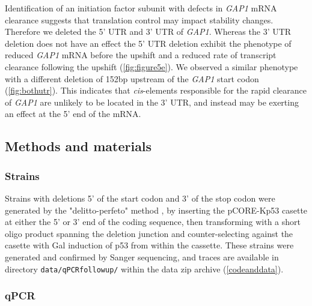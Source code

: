 Identification of an initiation factor subunit with defects in
\textit{GAP1} mRNA clearance suggests that translation control may
impact stability changes. Therefore we deleted the 5' UTR
and 3' UTR of \textit{GAP1}. 
Whereas the 3’ UTR deletion does not have an effect the 5’ UTR deletion
exhibit the phenotype of reduced \textit{GAP1} mRNA before the upshift
and a reduced rate of transcript clearance following the upshift
(\autoref{fig:figure5e}). 
We observed a similar phenotype with a different deletion of 152bp upstream
of the \textit{GAP1} start codon (\autoref{fig:bothutr}). 
This indicates that \textit{cis}-elements responsible for the
rapid clearance of \textit{GAP1} are unlikely to be located in the
3' UTR, and instead may be exerting an effect at the 5' end of the
mRNA.

\subsection{Methods and materials}

\subsubsection{Strains}

Strains with deletions 5' of the start codon and 3' of the stop
codon were generated by the "delitto-perfeto" 
method \parencite{storici2006delitto}, 
by inserting the pCORE-Kp53 casette
at either the 5' or 3' end of the coding sequence, then transforming
with a short oligo product spanning the deletion junction and
counter-selecting against the casette with Gal induction of p53 
from within the cassette.
These strains were generated and confirmed by Sanger sequencing,
and traces are available in directory \texttt{data/qPCRfollowup/} 
within the data zip archive (\autoref{codeanddata}).

\subsubsection{qPCR}

